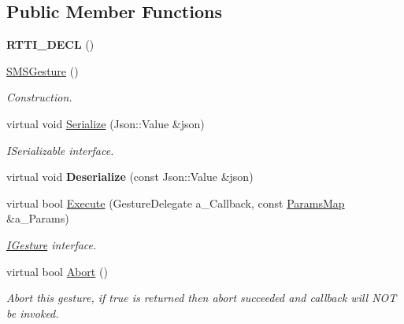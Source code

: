 \subsection*{Public Member Functions}
\begin{DoxyCompactItemize}
\item 
\mbox{\label{class_s_m_s_gesture_ac79a5910640fb6020f135cc119a580ad}} 
{\bfseries R\+T\+T\+I\+\_\+\+D\+E\+CL} ()
\item 
\mbox{\label{class_s_m_s_gesture_a765d7d9bbd1caf03ed658d097b0fb3d3}} 
\hyperlink{class_s_m_s_gesture_a765d7d9bbd1caf03ed658d097b0fb3d3}{S\+M\+S\+Gesture} ()
\begin{DoxyCompactList}\small\item\em Construction. \end{DoxyCompactList}\item 
\mbox{\label{class_s_m_s_gesture_ad90bf727e605943ae51311646da1f56e}} 
virtual void \hyperlink{class_s_m_s_gesture_ad90bf727e605943ae51311646da1f56e}{Serialize} (Json\+::\+Value \&json)
\begin{DoxyCompactList}\small\item\em I\+Serializable interface. \end{DoxyCompactList}\item 
\mbox{\label{class_s_m_s_gesture_aeb16eb701c7a6eeea5f0f1fd662c1033}} 
virtual void {\bfseries Deserialize} (const Json\+::\+Value \&json)
\item 
\mbox{\label{class_s_m_s_gesture_ab857d98828882acecc1d5ecd0462a6f3}} 
virtual bool \hyperlink{class_s_m_s_gesture_ab857d98828882acecc1d5ecd0462a6f3}{Execute} (Gesture\+Delegate a\+\_\+\+Callback, const \hyperlink{class_params_map}{Params\+Map} \&a\+\_\+\+Params)
\begin{DoxyCompactList}\small\item\em \hyperlink{class_i_gesture}{I\+Gesture} interface. \end{DoxyCompactList}\item 
\mbox{\label{class_s_m_s_gesture_adb8a28f69582ab2536fe02b96f87140f}} 
virtual bool \hyperlink{class_s_m_s_gesture_adb8a28f69582ab2536fe02b96f87140f}{Abort} ()
\begin{DoxyCompactList}\small\item\em Abort this gesture, if true is returned then abort succeeded and callback will N\+OT be invoked. \end{DoxyCompactList}\end{DoxyCompactItemize}
